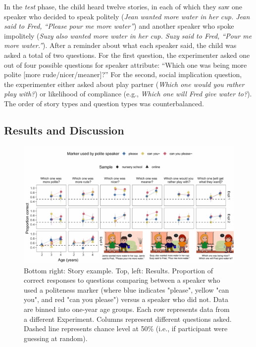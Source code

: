 \documentclass[10pt, letterpaper]{article}
\newenvironment{CodeChunk}{}{}
\begin{document}
In the \emph{test} phase, the child heard twelve stories, in each of
which they saw one speaker who decided to speak politely (\emph{Jean
wanted more water in her cup. Jean said to Fred, ``Please pour me more
water''}) and another speaker who spoke impolitely (\emph{Suzy also
wanted more water in her cup. Suzy said to Fred, ``Pour me more
water.''}). After a reminder about what each speaker said, the child was
asked a total of two questions. For the first question, the experimenter
asked one out of four possible questions for speaker attribute: ``Which
one was being more polite {[}more rude/nicer/meaner{]}?'' For the
second, social implication question, the experimenter either asked about
play partner (\emph{Which one would you rather play with?}) or
likelihood of compliance (e.g., \emph{Which one will Fred give water
to?}). The order of story types and question types was counterbalanced.

\subsection{Results and Discussion}\label{results-and-discussion}

\begin{CodeChunk}
\begin{figure}[h]

{\centering \includegraphics{figs/fig_results_placement-1} 

}

\caption[Bottom right]{Bottom right: Story example. Top, left: Results. Proportion of correct responses to questions comparing between a speaker who used a politeness marker (where blue indicates "please", yellow "can you", and red "can you please") versus a speaker who did not. Data are binned into one-year age groups. Each row represents data from a different Experiment. Columns represent different questions asked. Dashed line represents chance level at 50\% (i.e., if participant were guessing at random).}\label{fig:fig_results_placement}
\end{figure}
\end{CodeChunk}
\end{document}

